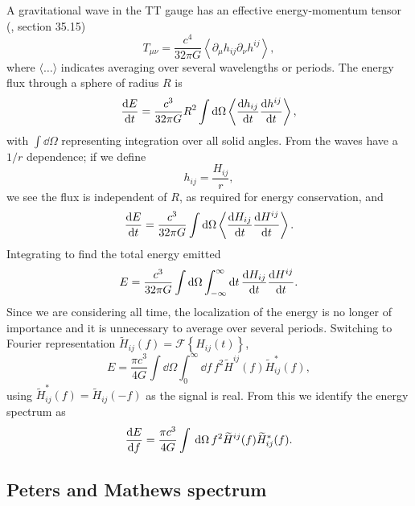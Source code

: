 A gravitational wave in the TT gauge has an effective energy-momentum tensor (\citealt{Misner1973}, section 35.15)
\begin{equation}
T_{\mu\nu} = \frac{c^4}{32\pi G}\left\langle\partial_\mu h_{ij} \partial_\nu h^{ij}\right\rangle,
\end{equation}
where $\langle\ldots\rangle$ indicates averaging over several wavelengths or periods. The energy flux through a sphere of radius $R$ is
\begin{equation}
\frac{\mathrm{d} {E}}{\mathrm{d} {t}} = \frac{c^3}{32\pi G} R^2 \int{\ensuremath{\mathrm{d}}\Omega}\left\langle\frac{\mathrm{d} {h_{ij}}}{\mathrm{d} {t}}\frac{\mathrm{d} {h^{ij}}}{\mathrm{d} {t}}\right\rangle,
\end{equation}
with $\int{\dd\Omega}$ representing integration over all solid angles. From  the waves have a $1/{r}$ dependence; if we define
\begin{equation}
h_{ij} = \frac{H_{ij}}{r},
\end{equation}
we see the flux is independent of $R$, as required for energy conservation, and
\begin{equation}
\frac{\mathrm{d} {E}}{\mathrm{d} {t}} = \frac{c^3}{32\pi G} \int{\ensuremath{\mathrm{d}}\Omega}\left\langle\frac{\mathrm{d} {H_{ij}}}{\mathrm{d} {t}}\frac{\mathrm{d} {H^{ij}}}{\mathrm{d} {t}}\right\rangle.
\end{equation}
Integrating to find the total energy emitted
\begin{equation}
E = \frac{c^3}{32\pi G} \int{\ensuremath{\mathrm{d}}\Omega}\int_{-\infty}^{\infty}{\mathrm{d} t} \, \frac{\mathrm{d} {H_{ij}}}{\mathrm{d} {t}}\frac{\mathrm{d} {H^{ij}}}{\mathrm{d} {t}}.
\label{eq:integrate_E}
\end{equation}
Since we are considering all time, the localization of the energy is no longer of importance and it is unnecessary to average over several periods. Switching to Fourier representation $\widetilde{H}_{ij}(f) = \mathscr{F}\left\{H_{ij}(t)\right\}$,
\begin{equation}
E = \frac{\pi c^3}{4 G} \int{\dd\Omega}\int_{0}^{\infty}{\dd f} \, f^2 \widetilde{H}^{ij}(f)\widetilde{H}_{ij}^*(f),
\label{eq:total_E}
\end{equation}
using $\widetilde{H}_{ij}^*(f) = \widetilde{H}_{ij}(-f)$ as the signal is real. From this we identify the energy spectrum as
\begin{align}
\frac{\mathrm{d} {E}}{\mathrm{d} {f}} = \frac{\pi c^3}{4 G} \int_{}^{}{}\,\mathrm{d}{\Omega} \, f^2 \widetilde{H}^{ij}(f)\widetilde{H}_{ij}^*(f).
\label{eq:NK_dEdf}
\end{align}

\subsection{Peters and Mathews spectrum}

